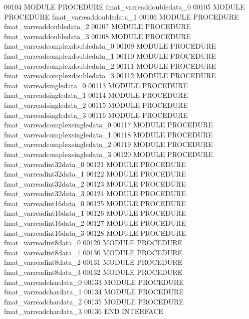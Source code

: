 \begin{DoxyCode}
00104         \textcolor{keyword}{MODULE PROCEDURE} fmat\_varreaddoubledata\_0
00105         \textcolor{keyword}{MODULE PROCEDURE} fmat\_varreaddoubledata\_1
00106         \textcolor{keyword}{MODULE PROCEDURE} fmat\_varreaddoubledata\_2
00107         \textcolor{keyword}{MODULE PROCEDURE} fmat\_varreaddoubledata\_3
00108         \textcolor{keyword}{MODULE PROCEDURE} fmat\_varreadcomplexdoubledata\_0
00109         \textcolor{keyword}{MODULE PROCEDURE} fmat\_varreadcomplexdoubledata\_1
00110         \textcolor{keyword}{MODULE PROCEDURE} fmat\_varreadcomplexdoubledata\_2
00111         \textcolor{keyword}{MODULE PROCEDURE} fmat\_varreadcomplexdoubledata\_3
00112         \textcolor{keyword}{MODULE PROCEDURE} fmat\_varreadsingledata\_0
00113         \textcolor{keyword}{MODULE PROCEDURE} fmat\_varreadsingledata\_1
00114         \textcolor{keyword}{MODULE PROCEDURE} fmat\_varreadsingledata\_2
00115         \textcolor{keyword}{MODULE PROCEDURE} fmat\_varreadsingledata\_3
00116         \textcolor{keyword}{MODULE PROCEDURE} fmat\_varreadcomplexsingledata\_0
00117         \textcolor{keyword}{MODULE PROCEDURE} fmat\_varreadcomplexsingledata\_1
00118         \textcolor{keyword}{MODULE PROCEDURE} fmat\_varreadcomplexsingledata\_2
00119         \textcolor{keyword}{MODULE PROCEDURE} fmat\_varreadcomplexsingledata\_3
00120         \textcolor{keyword}{MODULE PROCEDURE} fmat\_varreadint32data\_0
00121         \textcolor{keyword}{MODULE PROCEDURE} fmat\_varreadint32data\_1
00122         \textcolor{keyword}{MODULE PROCEDURE} fmat\_varreadint32data\_2
00123         \textcolor{keyword}{MODULE PROCEDURE} fmat\_varreadint32data\_3
00124         \textcolor{keyword}{MODULE PROCEDURE} fmat\_varreadint16data\_0
00125         \textcolor{keyword}{MODULE PROCEDURE} fmat\_varreadint16data\_1
00126         \textcolor{keyword}{MODULE PROCEDURE} fmat\_varreadint16data\_2
00127         \textcolor{keyword}{MODULE PROCEDURE} fmat\_varreadint16data\_3
00128         \textcolor{keyword}{MODULE PROCEDURE} fmat\_varreadint8data\_0
00129         \textcolor{keyword}{MODULE PROCEDURE} fmat\_varreadint8data\_1
00130         \textcolor{keyword}{MODULE PROCEDURE} fmat\_varreadint8data\_2
00131         \textcolor{keyword}{MODULE PROCEDURE} fmat\_varreadint8data\_3
00132         \textcolor{keyword}{MODULE PROCEDURE} fmat\_varreadchardata\_0
00133         \textcolor{keyword}{MODULE PROCEDURE} fmat\_varreadchardata\_1
00134         \textcolor{keyword}{MODULE PROCEDURE} fmat\_varreadchardata\_2
00135         \textcolor{keyword}{MODULE PROCEDURE} fmat\_varreadchardata\_3
00136 \textcolor{keyword}{    END INTERFACE}

\end{DoxyCode}
